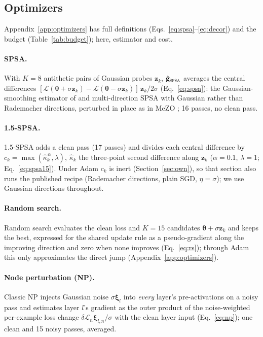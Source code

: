 \documentclass{article}
\newcommand{\method}[1]{\textsc{#1}}
\newcommand{\SPSA}{\method{spsa}}
\newcommand{\ghat}{\hat{\mathbf{g}}}
\newcommand{\btheta}{\boldsymbol{\theta}}
\newcommand{\bxi}{\boldsymbol{\xi}}
\newcommand{\bz}{\mathbf{z}}
\newcommand{\dL}{\delta\mathcal{L}}
\newcommand{\loss}{\mathcal{L}}
\begin{document}
\subsection{Optimizers}
\label{sec:optimizers}

Appendix~\ref{app:optimizers} has full definitions
(Eqs.~\eqref{eq:spsa}--\eqref{eq:decor}) and the budget (Table~\ref{tab:budget});
here, estimator and cost.

\paragraph{SPSA.}
With $K=8$ antithetic pairs of Gaussian probes $\bz_k$, $\ghat_{\SPSA}$ averages the
central differences
$[\loss(\btheta+\sigma\bz_k)-\loss(\btheta-\sigma\bz_k)]\,\bz_k/2\sigma$
(Eq.~\eqref{eq:spsa}): the Gaussian-smoothing estimator of \citet{nesterov2017} and
multi-direction SPSA \citep{spall1992} with Gaussian rather than Rademacher directions,
perturbed in place as in MeZO \citep{malladi2023}; 16 passes, no clean pass.

\paragraph{1.5-SPSA.}
1.5-SPSA \citep{chaubard2025spsa15} adds a clean pass (17 passes) and divides each
central difference by $c_k=\max(\hat\kappa_k^{\,\alpha},\lambda)$, $\hat\kappa_k$ the
three-point second difference along $\bz_k$ ($\alpha=0.1$, $\lambda=1$;
Eq.~\eqref{eq:spsa15}). Under Adam $c_k$ is inert (Section~\ref{sec:own}), so
that section also runs the published recipe (Rademacher directions, plain
SGD, $\eta=\sigma$); we use Gaussian directions throughout.

\paragraph{Random search.}
Random search \citep{rastrigin1963,matyas1965,schumer1968} evaluates the clean loss
and $K=15$ candidates $\btheta+\sigma\bz_k$ and keeps the best, expressed for the
shared update rule as a pseudo-gradient along the improving direction and zero when
none improves (Eq.~\eqref{eq:rs}); through Adam this only approximates the direct
jump (Appendix~\ref{app:optimizers}).

\paragraph{Node perturbation (NP).}
Classic NP \citep{widrow1990,werfel2003,fiete2006,hiratani2022} injects Gaussian noise
$\sigma\bxi_l$ into \emph{every} layer's pre-activations on a noisy pass and estimates
layer $l$'s gradient as the outer product of the noise-weighted per-example loss
change $\dL_n\bxi_{l,n}/\sigma$ with the clean layer input (Eq.~\eqref{eq:np}); one
clean and 15 noisy passes, averaged.
\end{document}

